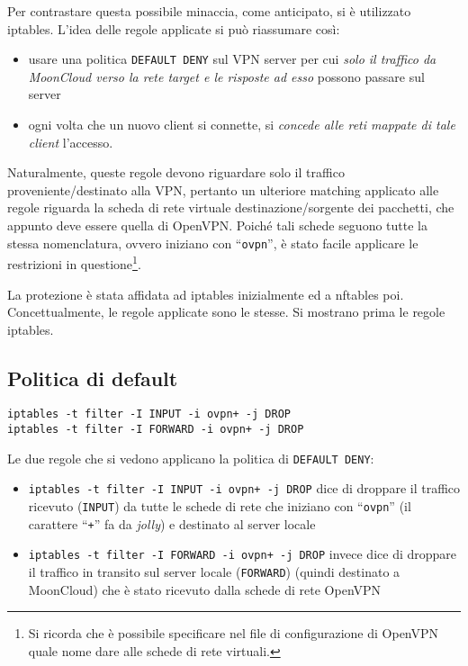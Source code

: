  
Per contrastare questa possibile minaccia, come anticipato, si è utilizzato iptables.
L'idea delle regole applicate si può riassumare così:
\begin{itemize}
	\item usare una politica \texttt{DEFAULT DENY} sul VPN server per cui \textit{solo
		il traffico da MoonCloud verso la rete target e le risposte ad esso} possono passare sul server
		\item ogni volta che un nuovo client si connette, si \textit{concede alle reti
			mappate di tale client} l'accesso.
		\end{itemize}
				
		Naturalmente, queste regole devono riguardare solo il traffico proveniente/destinato
		alla VPN, pertanto un ulteriore matching applicato alle regole riguarda la scheda di
		rete virtuale destinazione/sorgente dei pacchetti, che appunto deve essere quella
		di OpenVPN. Poiché tali schede seguono tutte la stessa nomenclatura, ovvero iniziano con
		``\texttt{ovpn}'', è stato facile applicare le restrizioni in questione\footnote{Si ricorda che
			è possibile specificare nel file di configurazione di OpenVPN quale nome dare alle schede di rete
		virtuali.}.
		
		La protezione è stata affidata ad iptables inizialmente ed a nftables poi. Concettualmente,
		le regole applicate sono le stesse. Si mostrano prima le regole iptables.
				
		\subsection{Politica di default}
				
		\begin{verbatim}
iptables -t filter -I INPUT -i ovpn+ -j DROP
iptables -t filter -I FORWARD -i ovpn+ -j DROP
		\end{verbatim}
				
		Le due regole che si vedono applicano la politica di \texttt{DEFAULT DENY}:
		\begin{itemize}
			\item \texttt{iptables -t filter -I INPUT -i ovpn+ -j DROP} dice di droppare
			      il traffico ricevuto (\texttt{INPUT})
			      da tutte le schede di rete che iniziano con ``\texttt{ovpn}''
			      (il carattere ``\texttt{+}'' fa da \textit{jolly}) e destinato al server locale
			\item \texttt{iptables -t filter -I FORWARD -i ovpn+ -j DROP} invece dice
			      di droppare il traffico in transito sul server locale (\texttt{FORWARD}) (quindi
			      destinato a MoonCloud)
			      che è stato ricevuto dalla schede di rete OpenVPN
		\end{itemize}
				

